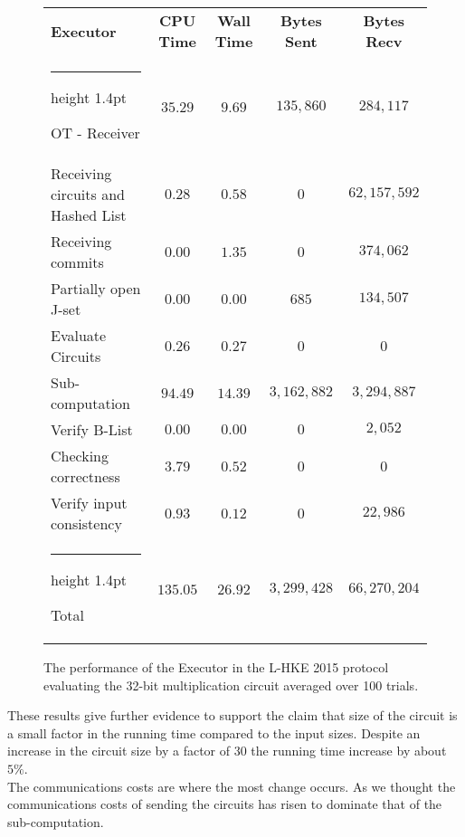 \documentclass[11pt]{article} %
\makeatletter
\newcommand{\thickhline}{%
    \noalign {\ifnum 0=`}\fi \hrule height 1.4pt
    \futurelet \reserved@a \@xhline
}
\makeatother
\begin{document}
				\begin{figure}[!ht]
					\begin{tabular}{| p{4.3cm} | c c c c |}
						\hline
						\textbf{Executor} & \textbf{CPU Time} & \textbf{Wall Time} & \textbf{Bytes Sent} & \textbf{Bytes Recv} \\
						\thickhline
						OT - Receiver & $35.29$ & $9.69$ & $135,860$ & $284,117$ \\
						\hline
						Receiving circuits and Hashed List & $0.28$ & $0.58$ & $0$ & $62,157,592$ \\
						\hline
						Receiving commits & $0.00$ & $1.35$ & $0$ & $374,062$ \\
						\hline
						Partially open J-set & $0.00$ & $0.00$ & $685$ & $134,507$ \\
						\hline
						Evaluate Circuits & $0.26$ & $0.27$ & $0$ & $0$ \\
						\hline
						Sub-computation & $94.49$ & $14.39$ & $3,162,882$ & $3,294,887$ \\
						\hline
						Verify B-List & $0.00$ & $0.00$ & $0$ & $2,052$ \\
						\hline
						Checking correctness & $3.79$ & $0.52$ & $0$ & $0$ \\
						\hline
						Verify input consistency & $0.93$ & $0.12$ & $0$ & $22,986$ \\
						\thickhline
						Total & $135.05$ & $26.92$ & $3,299,428$ & $66,270,204$ \\
						\hline
					\end{tabular}
					\caption{The performance of the Executor in the L-HKE 2015 protocol evaluating the 32-bit multiplication circuit averaged over 100 trials. \label{table:L-HKE_2015_Mul_Executor}}
				\end{figure}
				\FloatBarrier

				These results give further evidence to support the claim that size of the circuit is a small factor in the running time compared to the input sizes. Despite an increase in the circuit size by a factor of $30$ the running time increase by about $5\%$.\\

				The communications costs are where the most change occurs. As we thought the communications costs of sending the circuits has risen to dominate that of the sub-computation.\\
\end{document}
